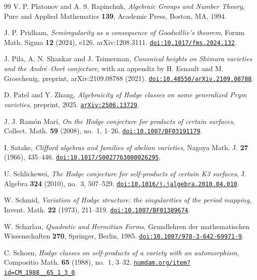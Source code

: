 \begin{thebibliography}{99}
V. P. Platonov and A. S. Rapinchuk,
\emph{Algebraic Groups and Number Theory},
Pure and Applied Mathematics \textbf{139},
Academic Press, Boston, MA, 1994.

J. P. Pridham,
\emph{Semiregularity as a consequence of Goodwillie's theorem},
Forum Math. Sigma \textbf{12} (2024), e126. arXiv:1208.3111.
\href{https://doi.org/10.1017/fms.2024.132}{\texttt{doi:10.1017/fms.2024.132}}.

J. Pila, A. N. Shankar and J. Tsimerman,
\emph{Canonical heights on Shimura varieties and the Andr\'e--Oort
conjecture}, with an appendix by H. Esnault and M. Groechenig,
preprint, arXiv:2109.08788 (2021).
\href{https://doi.org/10.48550/arXiv.2109.08788}{\texttt{doi:10.48550/arXiv.2109.08788}}.

D. Patel and Y. Zhang,
\emph{Algebraicity of Hodge classes on some generalized Prym varieties},
preprint, 2025.
\href{https://arxiv.org/abs/2506.13729}{\texttt{arXiv:2506.13729}}.

J. J. Ram\'on Mar\'i,
\emph{On the Hodge conjecture for products of certain surfaces},
Collect. Math. \textbf{59} (2008), no.~1, 1--26.
\href{https://doi.org/10.1007/BF03191179}{\texttt{doi:10.1007/BF03191179}}.

I. Satake,
\emph{Clifford algebras and families of abelian varieties},
Nagoya Math. J. \textbf{27} (1966), 435--446.
\href{https://doi.org/10.1017/S0027763000026295}{\texttt{doi:10.1017/S0027763000026295}}.

U. Schlickewei,
\emph{The Hodge conjecture for self-products of certain K3 surfaces},
J. Algebra \textbf{324} (2010), no.~3, 507--529.
\href{https://doi.org/10.1016/j.jalgebra.2010.04.010}{\texttt{doi:10.1016/j.jalgebra.2010.04.010}}.

W. Schmid,
\emph{Variation of Hodge structure: the singularities of the period mapping},
Invent. Math. \textbf{22} (1973), 211--319.
\href{https://doi.org/10.1007/BF01389674}{\texttt{doi:10.1007/BF01389674}}.

W. Scharlau,
\emph{Quadratic and Hermitian Forms},
Grundlehren der mathematischen Wissenschaften \textbf{270},
Springer, Berlin, 1985.
\href{https://doi.org/10.1007/978-3-642-69971-9}{\texttt{doi:10.1007/978-3-642-69971-9}}.

C. Schoen,
\emph{Hodge classes on self-products of a variety with an automorphism},
Compositio Math. \textbf{65} (1988), no.~1, 3--32.
\href{http://www.numdam.org/item?id=CM_1988__65_1_3_0}{\texttt{numdam.org/item?id=CM\_1988\_\_65\_1\_3\_0}}.


\end{thebibliography}
